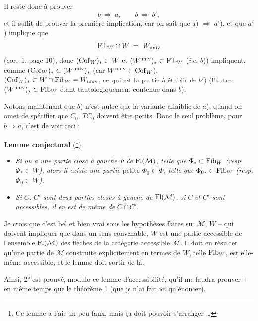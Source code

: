Il reste donc à prouver
\[ b \ \Longrightarrow\ a, \qquad b \ \Longrightarrow\ b', \]
et il suffit de prouver la première implication, car on sait que $a$) $\Longrightarrow$ $a'$), et que $a'$) implique que
\[ \Fib_W \cap W \ =\ W_{\univ} \]
(cor.~1, page 10), donc $(\mathrm{Cof}_W)_* \subset W$ et $(W^{\mathrm{univ}})_* \subset \mathrm{Fib}_W$ (\textit{i.e.} $b$)) impliquent, comme $(\mathrm{Cof}_W)_* \subset (W^{\mathrm{univ}})_*$ (car $W^{\mathrm{univ}} \subset \mathrm{Cof}_W$), $(\mathrm{Cof}_W)_* \subset W \cap \mathrm{Fib}_W = W_{\mathrm{univ}}$, ce qui est la partie à établir de $b'$) (l'autre $(W^{\mathrm{univ}})_* \subset \mathrm{Fib}_W$ étant tautologiquement contenue dans $b$).


Notons maintenant que $b$) n'est autre que la variante affaiblie de $a$), quand on omet de spécifier que $C_0$, $TC_0$ doivent être petits. Donc le seul problème, pour $b \Longrightarrow a$, c'est de voir ceci :

\textbf{Lemme conjectural} (\footnote[15]{Ce lemme a l'air un peu faux, mais ça doit pouvoir s'arranger \dots}).

\begin{itemize}[leftmargin=2.5em]
\item[\circled{1}] \textit{Si on a une partie close à gauche} $\Phi$ \textit{de} $\mathrm{Fl}(\mathcal{M})$\textit{, telle que} $\Phi_* \subset \mathrm{Fib}_W$ \textit{(resp.} $\Phi_* \subset W$\textit{), alors il existe une partie} petite $\Phi_0 \subset \Phi$\textit{, telle que} $\Phi_{0*} \subset \mathrm{Fib}_W$ \textit{(resp.} $\Phi_0 \subset W$\textit{).}

\item[\circled{2}] \textit{Si} $C$\textit{,} $C'$ \textit{sont deux parties closes à gauche de} $\mathrm{Fl}(\mathcal{M})$\textit{, si} $C$ \textit{et} $C'$ \textit{sont accessibles, il en est de même de} $C \cap C'$\textit{.}
\end{itemize}

Je crois que c'est bel et bien vrai sous les hypothèses faites sur $\mathcal{M}$, $W$ -- qui doivent impliquer que dans un sens convenable, $W$ est une partie accessible de l'ensemble $\mathrm{Fl}(\mathcal{M})$ des flèches de la catégorie accessible $\mathcal{M}$. Il doit en résulter qu'une partie de $\mathcal{M}$ construite explicitement en termes de $W$, telle $\mathrm{Fib}_W$, est elle-même accessible, et le lemme doit sortir de là.

Ainsi, 2° est prouvé, modulo ce lemme d'accessibilité, qu'il me faudra prouver $\pm$ en même temps que le théorème 1 (que je n'ai fait ici qu'énoncer).

